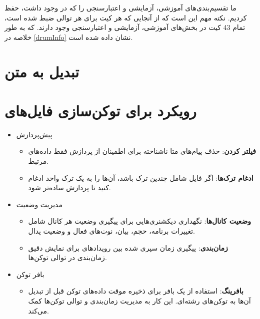 ما تقسیم‌بندی‌های آموزشی، آزمایشی و اعتبارسنجی را که در  وجود داشت، حفظ
کردیم. نکته مهم این است که از آنجایی که هر کیت برای هر توالی ضبط شده
است، تمام 43 کیت در بخش‌های آموزشی، آزمایشی و اعتبارسنجی وجود دارند. که به طور خلاصه در \ref{drumInfo} نشان داده شده است.


\section{تبدیل  به متن}

\section{رویکرد برای توکن‌سازی فایل‌های
  }
\begin{itemize}
      \item {پیش‌پردازش}
            \begin{itemize}
                  \item
                        \textbf{فیلتر کردن}: حذف پیام‌های متا ناشناخته برای اطمینان از پردازش
                        فقط داده‌های  مرتبط.
                  \item
                        \textbf{ادغام ترک‌ها}: اگر فایل  شامل چندین ترک باشد، آن‌ها را به یک
                        ترک واحد ادغام کنید تا پردازش ساده‌تر شود.
            \end{itemize}

      \item {مدیریت وضعیت}

            \begin{itemize}

                  \item
                        \textbf{وضعیت کانال‌ها}: نگهداری دیکشنری‌هایی برای پیگیری وضعیت هر کانال
                         شامل تغییرات برنامه، حجم، بیان، نوت‌های فعال و وضعیت پدال.
                  \item
                        \textbf{زمان‌بندی}: پیگیری زمان سپری شده بین رویدادهای  برای نمایش
                        دقیق زمان‌بندی در توالی توکن‌ها.
            \end{itemize}

      \item {بافر  توکن}

            \begin{itemize}

                  \item
                        \textbf{بافرینگ}: استفاده از یک بافر برای ذخیره موقت داده‌های توکن قبل
                        از تبدیل آن‌ها به توکن‌های رشته‌ای. این کار به مدیریت زمان‌بندی و توالی
                        توکن‌ها کمک می‌کند.
            \end{itemize}


\end{itemize}
